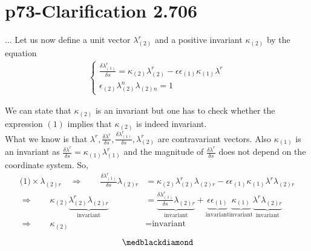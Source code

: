 \section{p73-Clarification 2.706}
\begin{tcolorbox}
... Let us now define a unit vector $\lambda^r_{(2)}$ and a positive invariant $\kappa_{(2)}$ by the equation \\
\begin{align}
\left \{ \begin{array}{c}
\frac{\delta\lambda_{(1)}^r}{\delta s} = \kappa_{(2)}\lambda^r_{(2)} - \epsilon\epsilon_{(1)}\kappa_{(1)}\lambda^r\\
\epsilon_{(2)}\lambda^n_{(2)}\lambda_{(2)n} = 1
\end{array} \right.
\end{align}  
\end{tcolorbox}
We can state that $\kappa_{(2)}$ is an invariant but one has to check whether the expression $(1)$ implies that $\kappa_{(2)}$ is indeed invariant.\\
What we know is that $\lambda^r, \frac{\delta \lambda^r}{\delta s},\frac{\delta\lambda_{(1)}^r}{\delta s},  \lambda^r_{(2)}$ are contravariant vectors. Also $\kappa_{(1)}$ is an invariant as $\frac{\delta\lambda^r}{\delta s} = \kappa_{(1)}\lambda^r_{(1)}$ and the magnitude of $\frac{\delta\lambda^r}{\delta s}$ does not depend on the coordinate system. So,
\begin{align}
\text{(1)}\times \lambda_{(2)r} \quad\Rightarrow \quad\quad \frac{\delta\lambda_{(1)}^r}{\delta s}\lambda_{(2)r} &= \kappa_{(2)}\lambda^r_{(2)}\lambda_{(2)r} - \epsilon\epsilon_{(1)}\kappa_{(1)}\lambda^r\lambda_{(2)r}\\
\Rightarrow \quad\quad \kappa_{(2)}\underbrace{\lambda^r_{(2)}\lambda_{(2)r}}_{\text{invariant}} &= \underbrace{\frac{\delta\lambda_{(1)}^r}{\delta s}\lambda_{(2)r}}_{\text{invariant}}  + \underbrace{\epsilon\epsilon_{(1)}}_{\text{invariant}} \underbrace{\kappa_{(1)}}_{\text{invariant}} \underbrace{\lambda^r \lambda_{(2)r}}_{\text{invariant}} \\
\Rightarrow \quad\quad \kappa_{(2)}&= \text{invariant} 
\end{align}
$$\medblackdiamond$$
\newpage

